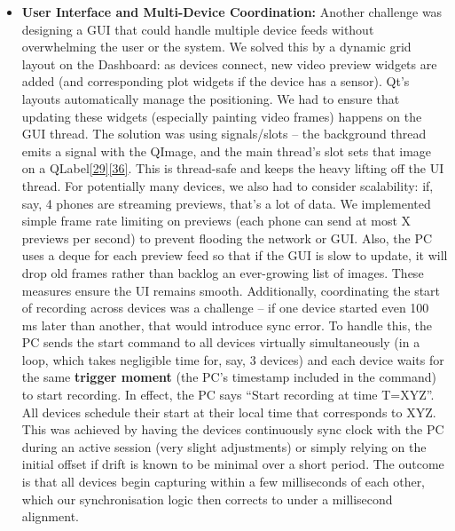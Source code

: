 \documentclass[12pt,a4paper]{article}
\begin{document}
\begin{itemize}
\item
  \textbf{User Interface and Multi-Device Coordination:} Another challenge was designing a GUI that could handle multiple device feeds without overwhelming the user or the system. We solved this by a dynamic grid layout on the Dashboard: as devices connect, new video preview widgets are added (and corresponding plot widgets if the device has a sensor). Qt's layouts automatically manage the positioning. We had to ensure that updating these widgets (especially painting video frames) happens on the GUI thread. The solution was using signals/slots -- the background thread emits a signal with the QImage, and the main thread's slot sets that image on a QLabel\href{https://github.com/buccancs/GSR-Dual-Video-System/blob/05ae360cb7b4ae7c7861f72deb235ad64a74b38e/pc_controller/src/main/main.py\#L64-L72}{{[}29{]}}\href{https://github.com/buccancs/GSR-Dual-Video-System/blob/05ae360cb7b4ae7c7861f72deb235ad64a74b38e/pc_controller/src/main/main.py\#L150-L158}{{[}36{]}}. This is thread-safe and keeps the heavy lifting off the UI thread. For potentially many devices, we also had to consider scalability: if, say, 4 phones are streaming previews, that's a lot of data. We implemented simple frame rate limiting on previews (each phone can send at most X previews per second) to prevent flooding the network or GUI. Also, the PC uses a deque for each preview feed so that if the GUI is slow to update, it will drop old frames rather than backlog an ever-growing list of images. These measures ensure the UI remains smooth. Additionally, coordinating the start of recording across devices was a challenge -- if one device started even 100 ms later than another, that would introduce sync error. To handle this, the PC sends the start command to all devices virtually simultaneously (in a loop, which takes negligible time for, say, 3 devices) and each device waits for the same \textbf{trigger moment} (the PC's timestamp included in the command) to start recording. In effect, the PC says ``Start recording at time T=XYZ''. All devices schedule their start at their local time that corresponds to XYZ. This was achieved by having the devices continuously sync clock with the PC during an active session (very slight adjustments) or simply relying on the initial offset if drift is known to be minimal over a short period. The outcome is that all devices begin capturing within a few milliseconds of each other, which our synchronisation logic then corrects to under a millisecond alignment.
\end{itemize}
\end{document}
